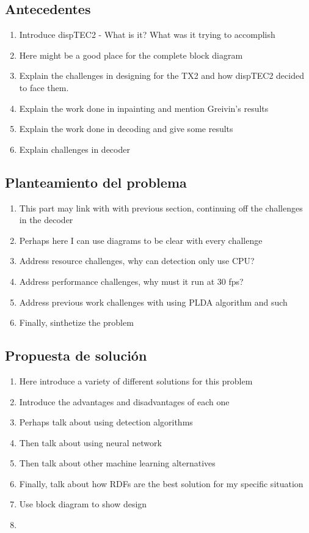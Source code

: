 \subsection{Antecedentes}

\begin{enumerate}
  \item Introduce dispTEC2 - What is it? What was it trying to accomplish
  \item Here might be a good place for the complete block diagram
  \item Explain the challenges in designing for the TX2 and how dispTEC2 decided to face them.
  \item Explain the work done in inpainting and mention Greivin's results
  \item Explain the work done in decoding and give some results
  \item Explain challenges in decoder
\end{enumerate}

\subsection{Planteamiento del problema}

\begin{enumerate}
  \item This part may link with with previous section, continuing off the challenges in the decoder
  \item Perhaps here I can use diagrams to be clear with every challenge
  \item Address resource challenges, why can detection only use CPU?
  \item Address performance challenges, why must it run at 30 fps?
  \item Address previous work challenges with using PLDA algorithm and such
  \item Finally, sinthetize the problem
\end{enumerate}

\subsection{Propuesta de solución}

\begin{enumerate}
  \item Here introduce a variety of different solutions for this problem
  \item Introduce the advantages and disadvantages of each one
  \item Perhaps talk about using detection algorithms
  \item Then talk about using neural network
  \item Then talk about other machine learning alternatives
  \item Finally, talk about how RDFs are the best solution for my specific situation
  \item Use block diagram to show design
  \item 
\end{enumerate}

